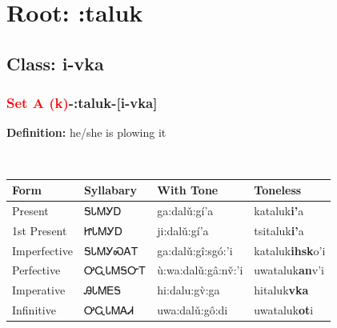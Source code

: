 \needspace{4in}
\section*{Root: :taluk}
\nopagebreak
{}
\needspace{3in}
\subsection*{Class: i-vka}
\nopagebreak
\needspace{2in}
\subsubsection*{\textcolor{Red}{Set A (k)}{-}\textbf{:taluk}{-}[i-vka]}
\nopagebreak
\textbf{Definition: } he/she is plowing it
\\[0.5em]
\begin{tabularx}{\textwidth}{l X X X}%
\toprule%
\textbf{Form}&\textbf{Syllabary}&\textbf{With Tone}&\textbf{Toneless}\\%
\midrule%
Present&ᎦᏓᎷᎩᎠ&ga:dalǔ:gí’a&kataluk\textbf{i'}a\\%
1st Present&ᏥᏓᎷᎩᎠ&ji:dalǔ:gí’a&tsitaluk\textbf{i'}a\\%
Imperfective&ᎦᏓᎷᎩᏍᎪᎢ&ga:dalǔ:gî:sgó:’i&kataluk\textbf{ihsk}o'i\\%
Perfective&ᎤᏩᏓᎷᎦᏅᎢ&ù:wa:dalǔ:gâ:nv̌:’i&uwataluk\textbf{an}v'i\\%
Imperative&ᎯᏓᎷᎬᎦ&hi:dalu:gv̀:ga&hitaluk\textbf{vka}\\%
Infinitive&ᎤᏩᏓᎷᎪᏗ&uwa:dalǔ:gô:di&uwataluk\textbf{ot}i\\%
\bottomrule%
\end{tabularx}
\\[1em]